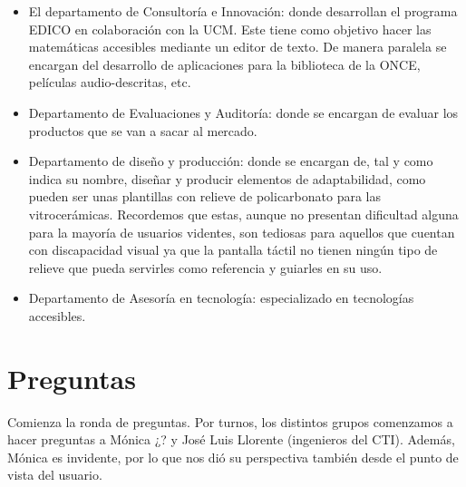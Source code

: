 \documentclass{article}
\begin{document}
	\begin{itemize}
		\item El departamento de Consultoría e Innovación: donde desarrollan el programa EDICO en colaboración con la UCM. Este tiene como objetivo hacer las matemáticas accesibles mediante un editor de texto. 
		De manera paralela se encargan del desarrollo de aplicaciones para la biblioteca de la ONCE, películas audio-descritas, etc.
		\item Departamento de Evaluaciones y Auditoría: donde se encargan de evaluar los productos que se van a sacar al mercado.
		\item Departamento de diseño y producción: donde se encargan de, tal y como indica su nombre, diseñar y producir elementos de adaptabilidad, como pueden ser unas plantillas con relieve de policarbonato para las vitrocerámicas. Recordemos que estas, aunque no presentan dificultad alguna para la mayoría de usuarios videntes, son tediosas para aquellos que cuentan con discapacidad visual ya que la pantalla táctil no tienen ningún tipo de relieve que pueda servirles como referencia y guiarles en su uso.
		\item Departamento de Asesoría en tecnología: especializado en tecnologías accesibles.
	\end{itemize}
	
	
	\section{Preguntas}
	
	Comienza la ronda de preguntas. Por turnos, los distintos grupos comenzamos a hacer preguntas a Mónica ¿? y José Luis Llorente (ingenieros del CTI). Además, Mónica es invidente, por lo que nos dió su perspectiva también desde el punto de vista del usuario.
	
\end{document}
